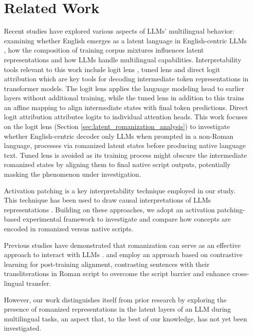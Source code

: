 \section{Related Work}
Recent studies have explored various aspects of LLMs' multilingual behavior: examining whether English emerges as a latent language in English-centric LLMs \cite{wendler-etal-2024-llamas}, how the composition of training corpus mixtures influences latent representations \cite{zhong2024beyond} and how LLMs handle multilingual capabilities\cite{zhao2024large}. Interpretability tools relevant to this work include logit lens \cite{logit-lens}, tuned lens \cite{belrose2023eliciting} and direct logit attribution \cite{elhage2021mathematical} which are key tools for decoding intermediate token representations in transformer models. The logit lens applies the language modeling head to earlier layers without additional training, while the tuned lens in addition to this trains an affine mapping to align intermediate states with final token predictions. Direct logit attribution attributes logits to individual attention heads. This work focuses on the logit lens (Section \ref{sec:latent_romanization_analysis}) to investigate whether English-centric decoder only LLMs when prompted in a non-Roman language, processes via romanized latent states before producing native language text. Tuned lens is avoided as its training process might obscure the intermediate romanized states by aligning them to final native script outputs, potentially masking the phenomenon under investigation.

Activation patching \citep{meng2022locating} is a key interpretability technique employed in our study. This technique has been used to draw causal interpretations of LLMs representations \cite{variengien2024look,geiger2022inducing,kramar2024atp,ghandeharioun2024patchscope,chen2024selfie}. Building on these approaches, we adopt an activation patching-based experimental framework to investigate and compare how concepts are encoded in romanized versus native scripts.

Previous studies have demonstrated that romanization can serve as an effective approach to interact with LLMs \cite{husain2024romansetu}. \citet{liu-etal-2024-translico} and \citet{xhelili-etal-2024-breaking} employ an approach based on contrastive learning for post-training alignment, contrasting sentences with their transliterations in Roman script to overcome the script barrier and enhance cross-lingual transfer.


However, our work distinguishes itself from prior research by exploring the presence of romanized representations in the latent layers of an LLM during multilingual tasks, an aspect that, to the best of our knowledge, has not yet been investigated.